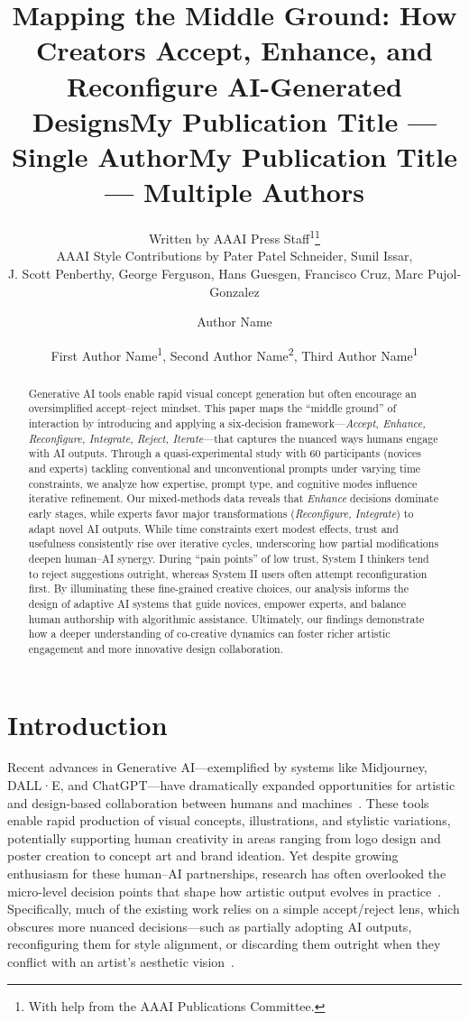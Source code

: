 \documentclass[letterpaper]{article} %
\title{Mapping the Middle Ground: How Creators Accept, Enhance, and Reconfigure AI-Generated Designs}
\author{
    Written by AAAI Press Staff\textsuperscript{\rm 1}\thanks{With help from the AAAI Publications Committee.}\\
    AAAI Style Contributions by Pater Patel Schneider,
    Sunil Issar,\\
    J. Scott Penberthy,
    George Ferguson,
    Hans Guesgen,
    Francisco Cruz\equalcontrib,
    Marc Pujol-Gonzalez\equalcontrib
}
\title{My Publication Title --- Single Author}
\author {
    Author Name
}
\title{My Publication Title --- Multiple Authors}
\author {
    First Author Name\textsuperscript{\rm 1},
    Second Author Name\textsuperscript{\rm 2},
    Third Author Name\textsuperscript{\rm 1}
}
\begin{document}
\maketitle

\begin{abstract}
Generative AI tools enable rapid visual concept generation but often encourage an oversimplified accept–reject mindset. This paper maps the “middle ground” of interaction by introducing and applying a six-decision framework—\textit{Accept, Enhance, Reconfigure, Integrate, Reject, Iterate}—that captures the nuanced ways humans engage with AI outputs. Through a quasi-experimental study with 60 participants (novices and experts) tackling conventional and unconventional prompts under varying time constraints, we analyze how expertise, prompt type, and cognitive modes influence iterative refinement. Our mixed-methods data reveals that \textit{Enhance} decisions dominate early stages, while experts favor major transformations (\textit{Reconfigure, Integrate}) to adapt novel AI outputs. While time constraints exert modest effects, trust and usefulness consistently rise over iterative cycles, underscoring how partial modifications deepen human–AI synergy. During “pain points” of low trust, System I thinkers tend to reject suggestions outright, whereas System II users often attempt reconfiguration first. By illuminating these fine-grained creative choices, our analysis informs the design of adaptive AI systems that guide novices, empower experts, and balance human authorship with algorithmic assistance. Ultimately, our findings demonstrate how a deeper understanding of co-creative dynamics can foster richer artistic engagement and more innovative design collaboration.
\end{abstract}

\section{Introduction}
Recent advances in Generative AI—exemplified by systems like Midjourney, DALL·E, and ChatGPT—have dramatically expanded opportunities for artistic and design-based collaboration between humans and machines~\cite{dwivedi2023opinion,giordano2024impact}. These tools enable rapid production of visual concepts, illustrations, and stylistic variations, potentially supporting human creativity in areas ranging from logo design and poster creation to concept art and brand ideation. Yet despite growing enthusiasm for these human–AI partnerships, research has often overlooked the micro-level decision points that shape how artistic output evolves in practice~\cite{creely2024creative,egon2023ai}. Specifically, much of the existing work relies on a simple accept/reject lens, which obscures more nuanced decisions—such as partially adopting AI outputs, reconfiguring them for style alignment, or discarding them outright when they conflict with an artist’s aesthetic vision~\cite{kim2023effect}.
\end{document}
